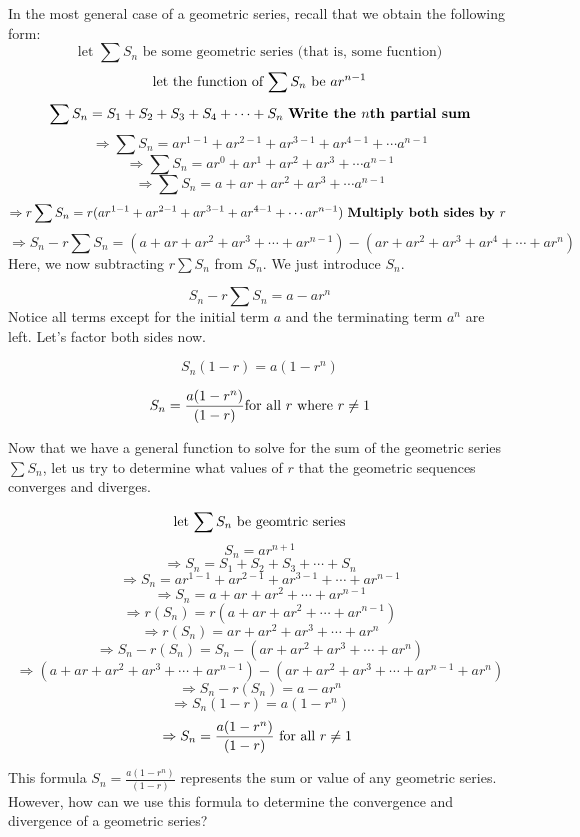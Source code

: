 \documentclass{report}
\begin{document}
\begin{sloppypar}
\par In the most general case of a geometric series, recall that
we obtain the following form:
\[ \textrm{let $\sum S_{n}$ be some geometric series (that is, some fucntion)}\]
\[ \textrm{let the function of $ \sum S_{n}$ be } ar^{n-1} \]
\[ \sum S_{n} = S_{1} + S_{2} + S_{3} + S_{4} + \cdots + S_{n}  \textrm{ \textbf{Write the $ n$th partial sum}}\]
\[ \Rightarrow \sum S_{n} = ar^{1-1} + ar^{2-1} + ar^{3-1} + ar^{4-1} + \cdots a^{n-1} \]
\[ \Rightarrow \sum S_{n} = ar^{0} + ar^{1} + ar^{2} + ar^{3} + \cdots a^{n-1} \]
\[ \Rightarrow \sum S_{n} = a + ar + ar^{2} + ar^{3} + \cdots a^{n-1} \]
\[ \Rightarrow
  r\sum S_{n} = r(ar^{1-1} + ar^{2-1} + ar^{3-1} + ar^{4-1} + \cdots ar^{n-1}) \textrm{ \textbf{Multiply both sides by $ r $} }\]
\[ \Rightarrow
  S_{n} - r\sum S_{n} = (a + ar + ar^{2} + ar^{3} + \cdots + ar^{n-1} ) - (ar + ar^{2} + ar^{3} + ar^{4} + \cdots + ar^{n})
\]
Here, we now subtracting $ r\sum S_{n}$ from $ S_{n} $. We just introduce $ S_{n} $.

\[ S_{n} - r\sum S_{n} = a - ar^{n}\]
Notice all terms except for the initial term $ a $ and the
terminating term $ a ^{n} $ are left. Let's factor both sides now.

\[ S_{n} (1 - r) = a (1 - r^{n}) \]

\[ S_{n} = \frac{a(1-r^{n})}{(1-r)} \textrm{for all $ r $ where $ r \neq 1 $} \]

Now that we have a general function to solve for the sum of the geometric series $ \sum S_{n} $,
let us try to determine what values of $ r $ that the geometric sequences converges and
diverges.

\[ \textrm{let $ \sum S_{n} $ be geomtric series} \]
\[ S_{n} = ar^{n+1}\]
\[ \Rightarrow S_{n} = S_{1} + S_{2} + S_{3} + \cdots + S_{n} \]
\[ \Rightarrow S_{n} = ar^{1-1} + ar^{2-1} + ar^{3-1} + \cdots + ar^{n-1} \]
\[ \Rightarrow S_{n} = a + ar + ar^{2} + \cdots + ar^{n-1} \]
\[ \Rightarrow r(S_{n}) = r(a + ar + ar^{2} + \cdots + ar^{n-1}) \]
\[ \Rightarrow r(S_{n}) = ar + ar^{2} + ar^{3} + \cdots + ar^{n} \]
\[ \Rightarrow S_{n} - r(S_{n}) = S_{n} - (ar + ar^{2} + ar^{3} + \cdots + ar^{n}) \]
\[ \Rightarrow (a + ar + ar^{2} + ar^{3} + \cdots + ar^{n-1}) - (ar + ar^{2} + ar^{3} + \cdots + ar^{n-1} + ar^{n}) \]
\[ \Rightarrow S_{n} - r(S_{n}) = a - ar^{n} \]
\[ \Rightarrow S_{n} (1 - r) = a(1 - r^{n}) \]
\[ \Rightarrow S_{n} = \frac{a(1-r^{n})}{(1-r)} \textrm{ for all $ r \neq 1 $ }\]

This formula $ S_{n} = \frac{a(1-r^{n})}{(1-r)} $ represents the sum or value of any geometric series. However,
how can we use this formula to determine the convergence and divergence of a geometric series?


\end{sloppypar}
\end{document}

